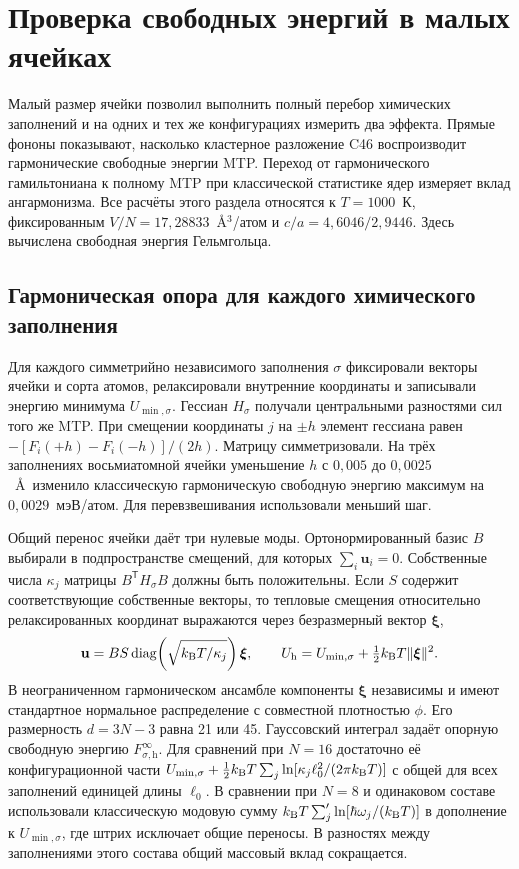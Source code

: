 \section{Проверка свободных энергий в малых ячейках}
\label{sec:smallcells}

Малый размер ячейки позволил выполнить полный перебор химических заполнений и
на одних и тех же конфигурациях измерить два эффекта. Прямые фононы показывают,
насколько кластерное разложение C46 воспроизводит гармонические свободные
энергии MTP. Переход от гармонического гамильтониана к полному MTP при
классической статистике ядер измеряет вклад ангармонизма. Все расчёты этого
раздела относятся к $T=1000$~К, фиксированным $V/N=17{,}28833$~\AA$^3$/атом
и $c/a=4{,}6046/2{,}9446$. Здесь вычислена свободная энергия Гельмгольца.

\subsection{Гармоническая опора для каждого химического заполнения}

Для каждого симметрийно независимого заполнения $\sigma$ фиксировали векторы
ячейки и сорта атомов, релаксировали внутренние координаты и записывали
энергию минимума $U_{\min,\sigma}$. Гессиан $H_\sigma$ получали центральными
разностями сил того же MTP. При смещении координаты $j$ на $\pm h$ элемент
гессиана равен $-[F_i(+h)-F_i(-h)]/(2h)$. Матрицу симметризовали. На трёх
заполнениях восьмиатомной ячейки уменьшение $h$ с $0{,}005$ до
$0{,}0025$~\AA\ изменило классическую гармоническую свободную энергию максимум
на $0{,}0029$~мэВ/атом. Для перевзвешивания использовали меньший шаг.

Общий перенос ячейки даёт три нулевые моды. Ортонормированный базис $B$
выбирали в подпространстве смещений, для которых $\sum_i\mathbf u_i=0$.
Собственные числа $\kappa_j$ матрицы $B^{\mathsf T}H_\sigma B$ должны быть
положительны. Если $S$ содержит соответствующие собственные векторы, то
тепловые смещения относительно релаксированных координат выражаются через
безразмерный вектор $\boldsymbol\xi$,
\begin{equation}
 \mathbf u=B S\,\mathrm{diag}\!\left(\sqrt{k_{\rm B}T/\kappa_j}\right)
  \boldsymbol\xi,\qquad
 U_{\mathrm h}=U_{\min,\sigma}+\tfrac12 k_{\rm B}T
                    \lVert\boldsymbol\xi\rVert^2 .
\end{equation}
В неограниченном гармоническом ансамбле компоненты $\boldsymbol\xi$
независимы и имеют стандартное нормальное распределение с совместной
плотностью $\phi$. Его размерность $d=3N-3$ равна 21 или 45. Гауссовский
интеграл задаёт опорную свободную энергию $F_{\sigma,\mathrm h}^{\infty}$.
Для сравнений при $N=16$ достаточно её конфигурационной части
$U_{\min,\sigma}+\tfrac12k_{\rm B}T\sum_j
\ln[\kappa_j\ell_0^2/(2\pi k_{\rm B}T)]$ с общей для всех заполнений единицей
длины $\ell_0$. В сравнении при $N=8$ и одинаковом составе использовали
классическую модовую сумму $k_{\rm B}T\sum'_j\ln[\hbar\omega_j/(k_{\rm B}T)]$
в дополнение к $U_{\min,\sigma}$, где штрих исключает общие переносы.
В разностях между заполнениями этого состава общий массовый вклад сокращается.

